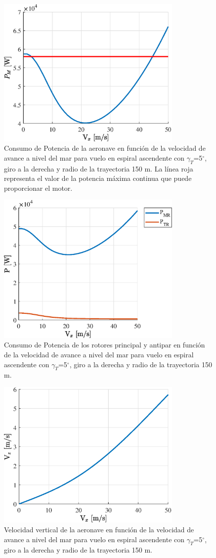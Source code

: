 \begin{figure}
	\centering
	\includegraphics[width=90mm]{graficos/PMVE}
	\caption{Consumo de Potencia de la aeronave en función de la velocidad de avance a nivel del mar para vuelo en espiral ascendente con $\gamma_T$=5$^\circ$, giro a la derecha y radio de la trayectoria 150 m. La línea roja representa el valor de la potencia máxima continua que puede proporcionar el motor.}
	\label{PMVE}
\end{figure}
\begin{figure}
	\centering
	\includegraphics[width=90mm]{graficos/PVE}
	\caption{Consumo de Potencia de los rotores principal y antipar en función de la velocidad de avance a nivel del mar para vuelo en espiral ascendente con $\gamma_T$=5$^\circ$, giro a la derecha y radio de la trayectoria 150 m.}
	\label{PVE}
\end{figure}
\begin{figure}
	\centering
	\includegraphics[width=90mm]{graficos/VzVE}
	\caption{Velocidad vertical de la aeronave en función de la velocidad de avance a nivel del mar para vuelo en espiral ascendente con $\gamma_T$=5$^\circ$, giro a la derecha y radio de la trayectoria 150 m.}
	\label{VzVE}
\end{figure}
